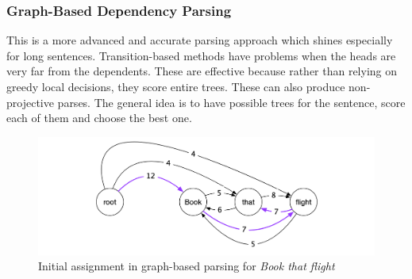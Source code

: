 \subsubsection{Graph-Based Dependency Parsing}
This is a more advanced and accurate parsing approach which shines especially
for long sentences. Transition-based methods have problems when the heads are
very far from the dependents. These are effective because rather than relying on
greedy local decisions, they score entire trees. These can also produce
non-projective parses. The general idea is to have possible trees for the
sentence, score each of them and choose the best one.
\begin{figure}[!h]
    \center
    \includegraphics[scale=0.2]{images/graph-based-parser}
    \caption{Initial assignment in graph-based parsing for \textit{Book that flight}\cite{stanfordLec}}
    \label{fig:transition_based_parser}
\end{figure}

